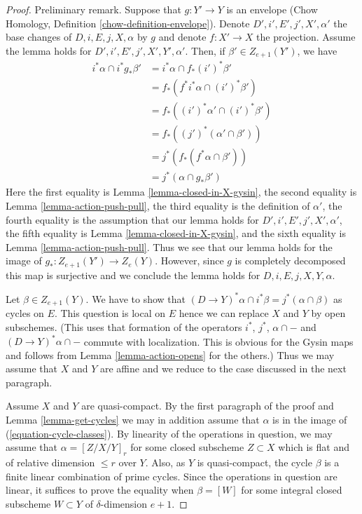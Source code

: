 \documentclass{stacks-project}
\theoremstyle{plain}
\theoremstyle{definition}
\theoremstyle{remark}
\numberwithin{equation}{subsection}
\begin{document}
\begin{proof}
Preliminary remark.
Suppose that $g : Y' \to Y$ is an envelope (Chow Homology, Definition
\ref{chow-definition-envelope}).
Denote $D', i', E', j', X', \alpha'$ the base changes of
$D, i, E, j, X, \alpha$ by $g$ and denote $f : X' \to X$ the projection.
Assume the lemma holds for $D', i', E', j', X', Y', \alpha'$.
Then, if $\beta' \in Z_{e + 1}(Y')$, we have
\begin{align*}
i^*\alpha \cap i^*g_*\beta'
& =
i^*\alpha \cap f_*(i')^*\beta' \\
& =
f_*(f^*i^*\alpha \cap (i')^*\beta') \\
& =
f_*((i')^*\alpha' \cap (i')^*\beta') \\
& =
f_*((j')^*(\alpha' \cap \beta')) \\
& =
j^*(f_*(f^*\alpha \cap \beta')) \\
& =
j^*(\alpha \cap g_*\beta')
\end{align*}
Here the
first equality is Lemma \ref{lemma-closed-in-X-gysin},
the second equality is Lemma \ref{lemma-action-push-pull},
the third equality is the definition of $\alpha'$,
the fourth equality is the assumption that our lemma holds for
$D', i', E', j', X', \alpha'$,
the fifth equality is Lemma \ref{lemma-closed-in-X-gysin}, and
the sixth equality is Lemma \ref{lemma-action-push-pull}.
Thus we see that our lemma holds for the image of
$g_* : Z_{e + 1}(Y') \to Z_e(Y)$. However, since $g$ is completely
decomposed this map is surjective and we conclude the lemma holds
for $D, i, E, j, X, Y, \alpha$.

\medskip\noindent
Let $\beta \in Z_{e + 1}(Y)$. We have to show that
$(D \to Y)^*\alpha \cap i^*\beta = j^*(\alpha \cap \beta)$
as cycles on $E$. This question is local on $E$ hence we
can replace $X$ and $Y$ by open subschemes. (This uses that formation
of the operators $i^*$, $j^*$, $\alpha \cap - $ and
$(D \to Y)^*\alpha \cap -$ commute with localization. This is
obvious for the Gysin maps and follows from
Lemma \ref{lemma-action-opens} for the others.)
Thus we may assume that $X$ and $Y$ are affine
and we reduce to the case discussed in the next paragraph.

\medskip\noindent
Assume $X$ and $Y$ are quasi-compact. By the first paragraph of the proof
and Lemma \ref{lemma-get-cycles} we may in addition assume that $\alpha$
is in the image of (\ref{equation-cycle-classes}). By linearity
of the operations in question, we may assume that $\alpha = [Z/X/Y]_r$
for some closed subscheme $Z \subset X$ which is flat and of relative
dimension $\leq r$ over $Y$. Also, as $Y$ is quasi-compact, the cycle
$\beta$ is a finite linear combination of prime cycles. Since the operations
in question are linear, it suffices
to prove the equality when $\beta = [W]$ for some integral closed subscheme
$W \subset Y$ of $\delta$-dimension $e + 1$.


\end{proof}
\end{document}
